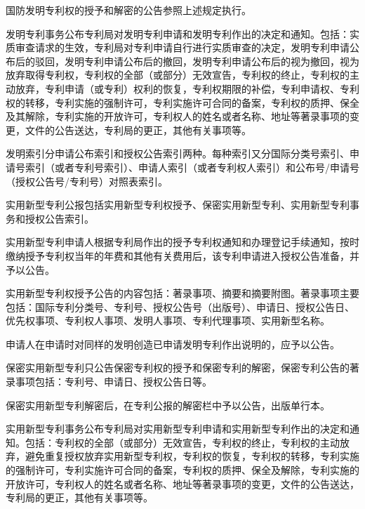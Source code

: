 国防发明专利权的授予和解密的公告参照上述规定执行。

发明专利事务公布专利局对发明专利申请和发明专利作出的决定和通知。包括：实质审查请求的生效，专利局对专利申请自行进行实质审查的决定，发明专利申请公布后的驳回，发明专利申请公布后的撤回，发明专利申请公布后的视为撤回，视为放弃取得专利权，专利权的全部（或部分）无效宣告，专利权的终止，专利权的主动放弃，专利申请（或专利）权利的恢复，专利权期限的补偿，专利申请权、专利权的转移，专利实施的强制许可，专利实施许可合同的备案，专利权的质押、保全及其解除，专利实施的开放许可，专利权人的姓名或者名称、地址等著录事项的变更，文件的公告送达，专利局的更正，其他有关事项等。

发明索引分申请公布索引和授权公告索引两种。每种索引又分国际分类号索引、申请号索引（或者专利号索引）、申请人索引（或者专利权人索引）和公布号/申请号（授权公告号/专利号）对照表索引。

实用新型专利公报包括实用新型专利权授予、保密实用新型专利、实用新型专利事务和授权公告索引。

实用新型专利申请人根据专利局作出的授予专利权通知和办理登记手续通知，按时缴纳授予专利权当年的年费和其他有关费用后，该专利申请进入授权公告准备，并予以公告。

实用新型专利权授予公告的内容包括：著录事项、摘要和摘要附图。著录事项主要包括：国际专利分类号、专利号、授权公告号（出版号）、申请日、授权公告日、优先权事项、专利权人事项、发明人事项、专利代理事项、实用新型名称。

申请人在申请时对同样的发明创造已申请发明专利作出说明的，应予以公告。

保密实用新型专利只公告保密专利权的授予和保密专利的解密，保密专利公告的著录事项包括：专利号、申请日、授权公告日等。

保密实用新型专利解密后，在专利公报的解密栏中予以公告，出版单行本。

实用新型专利事务公布专利局对实用新型专利申请和实用新型专利作出的决定和通知。包括：专利权的全部（或部分）无效宣告，专利权的终止，专利权的主动放弃，避免重复授权放弃实用新型专利权，专利权的恢复，专利权的转移，专利实施的强制许可，专利实施许可合同的备案，专利权的质押、保全及解除，专利实施的开放许可，专利权人的姓名或者名称、地址等著录事项的变更，文件的公告送达，专利局的更正，其他有关事项等。

